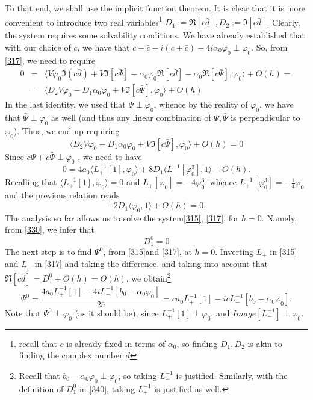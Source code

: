 \documentclass[12pt]{amsart}
\theoremstyle{definition}
\theoremstyle{remark}
\numberwithin{equation}{section}
\renewcommand{\(}{\left(}
\renewcommand{\)}{\right)}
\renewcommand{\[}{\left[}
\renewcommand{\]}{\right]}
\newcommand{\f}[2]{\frac{#1}{#2}}
\newcommand{\al}{\alpha}
\newcommand{\vp}{\varphi}
\newcommand{\dpr}[2]{\langle #1,#2 \rangle}
\begin{document}
 To that end, we shall use the implicit function theorem.  It is clear that it is more convenient to introduce two real  variables\footnote{recall that $c$ is already fixed in terms of $\al_0$, so finding $D_1, D_2$ is akin to finding the complex number  $d$} $D_1:=\Re[c\bar{d}], D_2:=\Im[c\bar{d}]$. Clearly, the system requires some solvability conditions. We have already established that with our choice of $c$, we have that $c-\bar{c} -i(c+\bar{c})-4 i \al_0 \vp_0\perp \vp_0$. So, from \eqref{317},  we need to require
 \begin{eqnarray*}
 	0 &=& \dpr{V\vp_0\Im(c\bar{d})+V \Im[c\bar{\Psi}]- \al_0 \vp_0\Re[c \bar{d}]-\al_0 \Re [c\bar{\Psi}]}{\vp_0}+O(h)= \\
 	&=&
 	\dpr{D_2 V\vp_0 - D_1 \al_0 \vp_0 + V \Im[c\bar{\Psi}]}{\vp_0}+O(h)
 \end{eqnarray*}
 In the last identity, we used that    $\Psi\perp \vp_0$, whence  by the reality of $\vp_0$, we have that $\bar{\Psi}\perp \vp_0$ as well (and thus  any linear combination of $\Psi, \bar{\Psi}$ is perpendicular to $\vp_0$).  Thus, we end up requiring
 \begin{equation}
 \label{320}
 \dpr{D_2 V\vp_0 - D_1 \al_0 \vp_0 + V \Im[c\bar{\Psi}]}{\vp_0}+O(h)=0
 \end{equation}
 Since  $\bar{c}\Psi+c\bar{\Psi}\perp \vp_0$  ,  we need to have
$$
 0=4 a_0 \dpr{L_+^{-1}[1]}{\vp_0} +8  D_1 \dpr{L_+^{-1}[\vp_0^3]}{1}+O(h).
 $$
 Recalling that $\dpr{L_+^{-1}[1]}{\vp_0}=0$ and   $L_+[\vp_0]=-4\vp_0^3$,  whence  $L_+^{-1}[\vp_0^3]=-\f{1}{4}\vp_0$ and the previous relation reads
 \begin{equation}
 \label{330}
-2D_1 \dpr{\vp_0}{1} +O(h)=0.
 \end{equation}
 The analysis so far allows us to solve the system\eqref{315}, \eqref{317}, for $h=0$.   Namely,  from \eqref{330}, we infer  that
 \begin{equation}
 \label{340}
 D_1^0=0
 \end{equation}
 The next step is to find $\Psi^0$, from \eqref{315}and \eqref{317}, at $h=0$. Inverting   $L_+$ in \eqref{315} and $L_-$ in \eqref{317} and taking the difference,  and taking into account that $\Re[c\bar{d}]=D_1^0+O(h)=O(h)$, we obtain\footnote{Recall that  $b_0-\al_0 \vp_0\perp \vp_0$, so taking $L_-^{-1}$  is justified. Similarly, with the definition of $D_1^0$ in \eqref{340}, taking $L_+^{-1}$ is justified as well.}
  \begin{equation}
 \label{350}
   \Psi^0 =  \f{4 a_0  L_+^{-1}[1]- 4 i L_-^{-1}[ b_0 - \al_0 \vp_0]}{2\bar{c}}= c a_0 L_+^{-1}[1] - i c L_-^{-1}[ b_0 - \al_0\vp_0].
 \end{equation}
 Note that $\Psi^0\perp \vp_0$ (as it should be), since $L_+^{-1}[1]\perp \vp_0$, and
 $Image[ L_-^{-1}]\perp \vp_0$.
\end{document}
